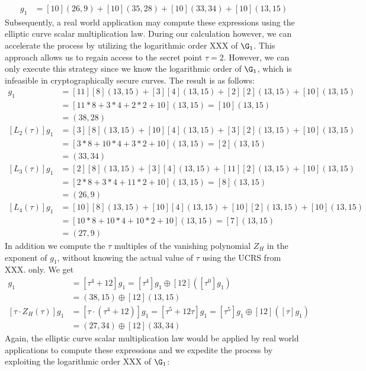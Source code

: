 \begin{example}
\begin{align*}
[L_4(\tau)]g_1 & = [10](26,9)+[10](35,28)+[10](33,34) + [10](13,15)
\end{align*}
Subsequently, a real world application may compute these expressions using the elliptic curve scalar multiplication law. During our calculation however, we can accelerate the process by utilizing the logarithmic order XXX of $\G_1$. This approach allows us to regain access to the secret point $\tau=2$. However, we can only execute this strategy since we know the logarithmic order of $\G_1$, which is infeasible in cryptographically secure curves. The result is as follows:
\begin{align*}
[L_1(\tau)]g_1 & = [11][8](13,15) +[3][4](13,15) +[2][2](13,15) + [10](13,15) \\
               & = [11*8+3*4+2*2+10](13,15) = [10](13,15) \\
               & = (38,28)\\
[L_2(\tau)]g_1 & = [3][8](13,15) + [10][4](13,15) + [3][2](13,15) + [10](13,15) \\
               & = [3*8+10*4+3*2+10](13,15) = [2](13,15) \\
               & = (33,34)\\
[L_3(\tau)]g_1 & = [2][8](13,15) + [3][4](13,15) +[11][2](13,15) +[10](13,15)\\
               & = [2*8+3*4+11*2+10](13,15) = [8](13,15)\\
               & = (26,9)\\
[L_4(\tau)]g_1 & = [10][8](13,15) + [10][4](13,15) + [10][2](13,15) + [10](13,15)\\
               & = [10*8 + 10*4 + 10*2 + 10](13,15) = [7] (13,15)\\
               & = (27,9)
\end{align*}
In addition we compute the $\tau$ multiples of the vanishing polynomial $Z_H$ in the exponent of $g_1$, without knowing the actual value of $\tau$ using the UCRS from XXX. only. We get 
\begin{align*}
[Z_H(\tau)]g_1 & = [\tau^4 + 12] g_1 = [\tau^4]g_1 \oplus [12]([\tau^0] g_1) \\
               & = (38,15) \oplus [12](13,15)\\
[\tau\cdot Z_H(\tau)]g_1 & = [\tau\cdot(\tau^4 + 12)] g_1 = [\tau^5 + 12\tau] g_1 =  
[\tau^5]g_1 \oplus [12]([\tau] g_1) \\
               & = (27,34) \oplus [12](33,34)          
\end{align*}
Again, the elliptic curve scalar multiplication law would be applied by real world applications to compute these expressions and we expedite the process by exploiting the logarithmic order XXX of $\G_1$:

\end{example}
